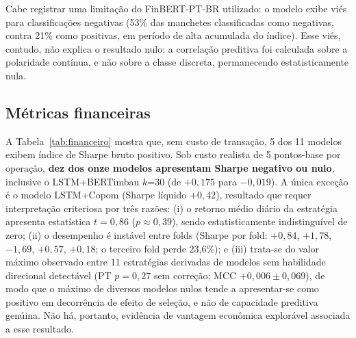 \documentclass[conference]{IEEEtran}
\begin{document}
Cabe registrar uma limita\c{c}\~ao do FinBERT-PT-BR utilizado: o modelo exibe vi\'es para classifica\c{c}\~oes negativas (53\% das manchetes classificadas como negativas, contra 21\% como positivas, em per\'iodo de alta acumulada do \'indice). Esse vi\'es, contudo, n\~ao explica o resultado nulo: a correla\c{c}\~ao preditiva foi calculada sobre a polaridade cont\'inua, e n\~ao sobre a classe discreta, permanecendo estatisticamente nula.

\subsection{M\'etricas financeiras}
\label{sec:financeiro-discussao}

A Tabela~\ref{tab:financeiro} mostra que, sem custo de transa\c{c}\~ao, 5 dos 11 modelos exibem \'indice de Sharpe bruto positivo. Sob custo realista de 5 pontos-base por opera\c{c}\~ao, \textbf{dez dos onze modelos apresentam Sharpe negativo ou nulo}, inclusive o LSTM+BERTimbau $k$=30 (de $+0{,}175$ para $-0{,}019$). A \'unica exce\c{c}\~ao \'e o modelo LSTM+Copom (Sharpe l\'iquido $+0{,}42$), resultado que requer interpreta\c{c}\~ao criteriosa por tr\^es raz\~oes: (i) o retorno m\'edio di\'ario da estrat\'egia apresenta estat\'istica $t=0{,}86$ ($p\approx0{,}39$), sendo estatisticamente indistingu\'ivel de zero; (ii) o desempenho \'e inst\'avel entre folds (Sharpe por fold: $+0{,}84$, $+1{,}78$, $-1{,}69$, $+0{,}57$, $+0{,}18$; o terceiro fold perde 23,6\%); e (iii) trata-se do valor m\'aximo observado entre 11 estrat\'egias derivadas de modelos sem habilidade direcional detect\'avel (PT $p=0{,}27$ sem corre\c{c}\~ao; MCC $+0{,}006\pm0{,}069$), de modo que o m\'aximo de diversos modelos nulos tende a apresentar-se como positivo em decorr\^encia de efeito de sele\c{c}\~ao, e n\~ao de capacidade preditiva gen\'uina. N\~ao h\'a, portanto, evid\^encia de vantagem econ\^omica explor\'avel associada a esse resultado.
\end{document}
